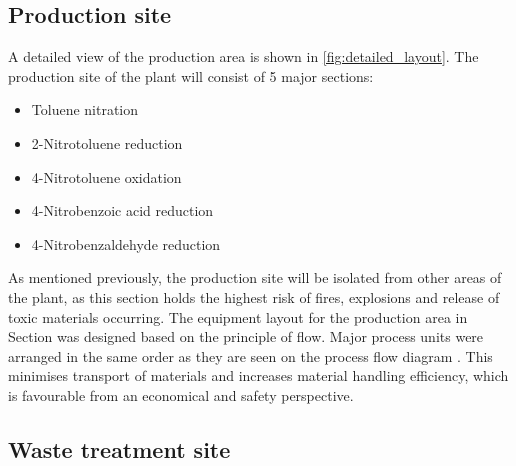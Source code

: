 \subsection{Production site}

A detailed view of the production area is shown in \cref{fig:detailed_layout}. The production site of the plant will consist of 5 major sections:

\begin{itemize}
    \item Toluene nitration
    \item 2-Nitrotoluene reduction 
    \item 4-Nitrotoluene oxidation 
    \item 4-Nitrobenzoic acid reduction 
    \item 4-Nitrobenzaldehyde reduction 
\end{itemize}

As mentioned previously, the production site will be isolated from other areas of the plant, as this section holds the highest risk of fires, explosions and release of toxic materials occurring. The equipment layout for the production area in Section  was designed based on the principle of flow. Major process units were arranged in the same order as they are seen on the process flow diagram \cite{mannan_lees_2012}. This minimises transport of materials and increases material handling efficiency, which is favourable from an economical and safety perspective.  

\subsection{Waste treatment site}

